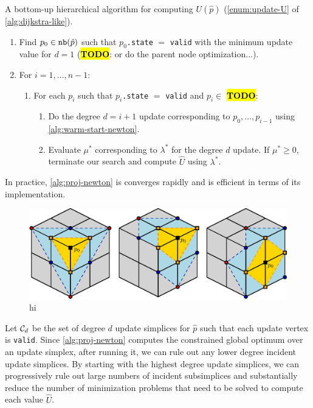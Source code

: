 \documentclass[eikonal.tex]{subfiles}
\begin{document}
\begin{algorithm}[H]
  \caption{A bottom-up hierarchical algorithm for computing
    $U(\hat{p})$ (\cref{enum:update-U} of
    \cref{alg:dijkstra-like}).}\label{alg:bottom-up}
  \begin{enumerate}[nolistsep]
  \item Find $p_0 \in \texttt{nb}(\hat{p})$ such that $p_0$\texttt{.state}
    $=$ \texttt{valid} with the minimum update value for $d = 1$
    (\hl{\textbf{TODO}}: or do the parent node optimization...).
  \item For $i = 1, \hdots, n - 1$:
    \begin{enumerate}
    \item For each $p_i$ such that $p_i$\texttt{.state} $=$
      \texttt{valid} and $p_i \in$ \hl{\textbf{TODO}}:
      \begin{enumerate}
      \item Do the degree $d = i + 1$ update corresponding to
        $p_0, \hdots, p_{i-1}$ using \cref{alg:warm-start-newton}.
      \item Evaluate $\mu^*$ corresponding to $\lambda^*$ for the
        degree $d$ update. If $\mu^* \geq 0$, terminate our search and
        compute $\hat{U}$ using $\lambda^*$.
      \end{enumerate}
    \end{enumerate}
  \end{enumerate}
\end{algorithm}

In practice, \cref{alg:proj-newton} is converges rapidly and is
efficient in terms of its implementation.

\begin{figure}[t]
  \centering
  \includegraphics[width=0.85\linewidth]{hu-neighborhoods.eps}
  \caption{hi}
\end{figure}

Let $\mathcal{C}_d$ be the set of degree $d$ update simplices for $\hat{p}$
such that each update vertex is \texttt{valid}. Since
\cref{alg:proj-newton} computes the constrained global optimum over an
update simplex, after running it, we can rule out any lower degree
incident update simplices. By starting with the highest degree update
simplices, we can progressively rule out large numbers of incident
subsimplices and substantially reduce the number of minimization
problems that need to be solved to compute each value $\hat{U}$.
\end{document}
